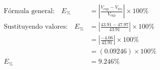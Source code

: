 \begin{align*}
\text{Fórmula general:} \quad
E_{\%} &= \left| \frac{V_{\text{exp}} - V_{\text{teo}}}{V_{\text{exp}}} \right| \times 100\% \\[8pt]
\text{Sustituyendo valores:} \quad
E_{\%} &= \left| \frac{43.91 - 47.97}{43.91} \right| \times 100\% \\[8pt]
&= \left| \frac{-4.06}{43.91} \right| \times 100\% \\[8pt]
&= (0.09246) \times 100\% \\[8pt]
E_{\%} &= 9.246\%
\end{align*}
